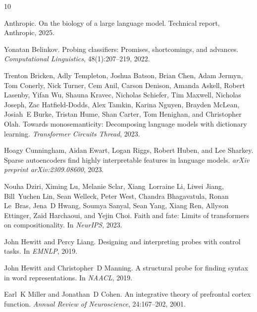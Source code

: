 \documentclass[10pt]{article}
\begin{document}
\begin{thebibliography}{10}

Anthropic.
\newblock On the biology of a large language model.
\newblock Technical report, Anthropic, 2025.

Yonatan Belinkov.
\newblock Probing classifiers: Promises, shortcomings, and advances.
\newblock \textit{Computational Linguistics}, 48(1):207--219, 2022.

Trenton Bricken, Adly Templeton, Joshua Batson, Brian Chen, Adam Jermyn, Tom Conerly, Nick Turner, Cem Anil, Carson Denison, Amanda Askell, Robert Lasenby, Yifan Wu, Shauna Kravec, Nicholas Schiefer, Tim Maxwell, Nicholas Joseph, Zac Hatfield-Dodds, Alex Tamkin, Karina Nguyen, Brayden McLean, Josiah~E Burke, Tristan Hume, Shan Carter, Tom Henighan, and Christopher Olah.
\newblock Towards monosemanticity: Decomposing language models with dictionary learning.
\newblock \textit{Transformer Circuits Thread}, 2023.

Hoagy Cunningham, Aidan Ewart, Logan Riggs, Robert Huben, and Lee Sharkey.
\newblock Sparse autoencoders find highly interpretable features in language models.
\newblock \textit{arXiv preprint arXiv:2309.08600}, 2023.

Nouha Dziri, Ximing Lu, Melanie Sclar, Xiang~Lorraine Li, Liwei Jiang, Bill~Yuchen Lin, Sean Welleck, Peter West, Chandra Bhagavatula, Ronan Le~Bras, Jena~D Hwang, Soumya Sanyal, Sean Yang, Xiang Ren, Allyson Ettinger, Za\"id Harchaoui, and Yejin Choi.
\newblock Faith and fate: Limits of transformers on compositionality.
\newblock In \textit{NeurIPS}, 2023.

John Hewitt and Percy Liang.
\newblock Designing and interpreting probes with control tasks.
\newblock In \textit{EMNLP}, 2019.

John Hewitt and Christopher~D Manning.
\newblock A structural probe for finding syntax in word representations.
\newblock In \textit{NAACL}, 2019.

Earl~K Miller and Jonathan~D Cohen.
\newblock An integrative theory of prefrontal cortex function.
\newblock \textit{Annual Review of Neuroscience}, 24:167--202, 2001.


\end{thebibliography}
\end{document}
